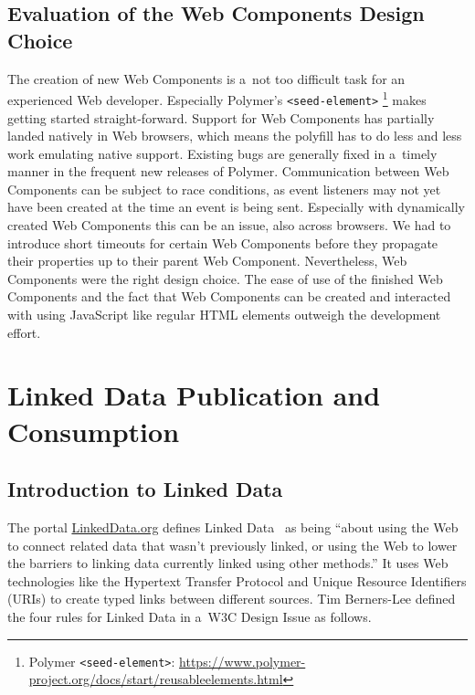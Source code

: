 \documentclass[runningheads,a4paper]{llncs}
\begin{document}
\subsection{Evaluation of the Web Components Design Choice}

The creation of new Web Components is a~not too difficult task
for an experienced Web developer.
Especially Polymer's \texttt{<seed-element>}%
\footnote{Polymer \texttt{<seed-element>}:
\url{https://www.polymer-project.org/docs/start/reusableelements.html}}
makes getting started straight-forward.
Support for Web Components has partially landed natively in Web browsers,
which means the polyfill has to do less and less work emulating native support.
Existing bugs are generally fixed in a~timely manner in the frequent new releases of Polymer.
Communication between Web Components can be subject to race conditions,
as event listeners may not yet have been created at the time an event is being sent.
Especially with dynamically created Web Components this can be an issue,
also across browsers.
We had to introduce short timeouts for certain Web Components
before they propagate their properties up to their parent Web Component.
Nevertheless, Web Components were the right design choice.
The ease of use of the finished Web Components %
and the fact that Web Components can be created and interacted with using JavaScript
like regular HTML elements outweigh the development effort.


\section{Linked Data Publication and Consumption}
\label{sec:linked-data-publication-and-consumption}


\subsection{Introduction to Linked Data}

The portal \url{LinkedData.org} defines Linked Data~\cite{bernerslee2006linkeddata} as being
``about using the Web to connect related data that wasn't previously linked,
or using the Web to lower the barriers to linking data currently linked using other methods.''
It uses Web technologies like the Hypertext Transfer Protocol %
and Unique Resource Identifiers (URIs) %
to create typed links between different sources.
Tim Berners-Lee defined the four rules for Linked Data in a~W3C Design Issue as follows.
\end{document}
